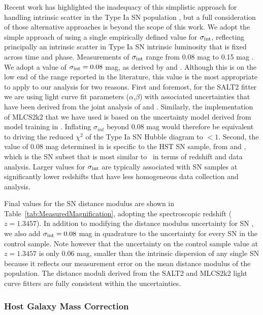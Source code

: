 Recent work has highlighted the inadequacy of this simplistic approach
for handling intrinsic scatter in the Type Ia SN
population \citep{Marriner:2011,Kessler:2013,Mosher:2014,Scolnic:2014a,Betoule:2014},
but a full consideration of those alternative approaches is beyond the
scope of this work.  We adopt the simple approach of using a single
empirically defined value for $\sigma_{\rm int}$, reflecting
principally an intrinsic scatter in Type Ia SN intrinsic luminosity
that is fixed across time and phase.  Measurements of $\sigma_{\rm
int}$ range from 0.08 mag \citep{Jha:2007,Conley:2011} to 0.15
mag \citep{Kessler:2009b,Suzuki:2012}.  We adopt a value of
$\sigma_{\rm int}=0.08$ mag, as derived by \citet{Jha:2007}
and \citet{Conley:2011}.  Although this is on the low end of the range
reported in the literature, this value is the most appropriate to
apply to our analysis for two reasons.  First and foremost, for the
SALT2 fitter we are using light curve fit parameters
($\alpha$,$\beta$) with associated uncertainties that have been
derived from the joint analysis of \citet{Conley:2011}
and \citet{Sullivan:2011}. Similarly, the implementation of MLCS2k2
that we have used is based on the uncertainty model derived from model
training in \citet{Jha:2007}.  Inflating $\sigma_{int}$ beyond 0.08
mag would therefore be equivalent to driving the reduced $\chi^2$ of
the Type Ia SN Hubble diagram to $<1$.  Second, the value of 0.08 mag
determined in \citet{Conley:2011} is specific to the HST SN sample,
from \citet{Riess:2007} and \citet{Suzuki:2012}, which is the SN
subset that is most similar to \tomas\ in terms of redshift and data
analysis.  Larger values for $\sigma_{\rm int}$ are typically
associated with SN samples at significantly lower redshifts that have
less homogeneous data collection and analysis. 

Final values for the SN distance modulus are shown in
Table~\ref{tab:MeasuredMagnification}, adopting the spectroscopic
redshift ($z=1.3457$).  In addition to modifying the distance modulus
uncertainty for SN \tomas, we also add $\sigma_{\rm int}=0.08$ mag in
quadrature to the uncertainty for every SN in the control sample. Note
however that the uncertainty on the control sample value at $z=1.3457$
is only 0.06 mag, smaller than the intrinsic dispersion of
any single SN because it reflects our measurement error on the mean
distance modulus of the population.  The distance moduli derived from
the SALT2 and MLCS2k2 light curve fitters are fully consistent within
the uncertainties.

\subsubsection{Host Galaxy Mass Correction}
\label{sec:HostGalaxyMassCorrection}

